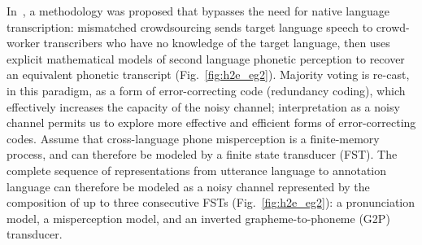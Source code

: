In~\cite{JHJ15a}, a methodology was proposed that bypasses the need
for native language transcription: mismatched crowdsourcing sends target
language speech to crowd-worker transcribers who have no
knowledge of the target language, then uses explicit mathematical
models of second language phonetic perception to recover an equivalent
phonetic transcript (Fig.~\ref{fig:h2e_eg2}).  Majority voting is
re-cast, in this paradigm, as a form of error-correcting code
(redundancy coding), which effectively increases the capacity of the
noisy channel; interpretation as a noisy channel permits us to explore
more effective and efficient forms of error-correcting codes.
Assume that cross-language phone misperception is a finite-memory
process, and can therefore be modeled by a finite state transducer
(FST).  The complete sequence of representations from utterance
language to annotation language can therefore be modeled as a noisy
channel represented by the composition of up to three consecutive FSTs
(Fig.~\ref{fig:h2e_eg2}): a pronunciation model, a misperception
model, and an inverted grapheme-to-phoneme (G2P) transducer.
